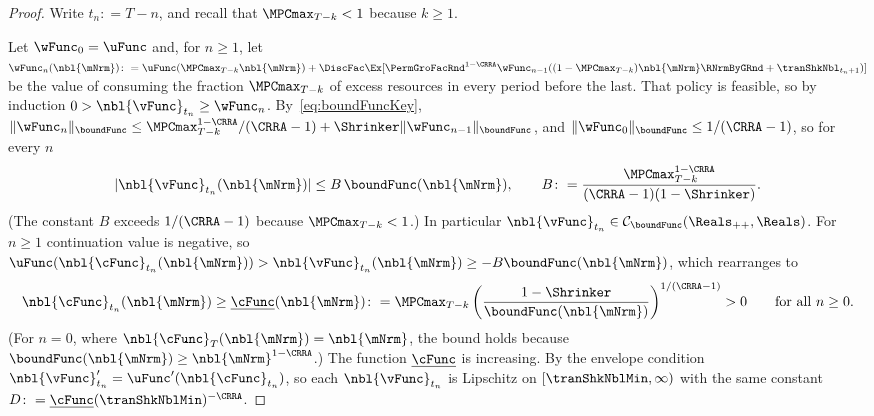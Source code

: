 \documentclass[\econtexRoot/BufferStockTheory]{subfiles}
\begin{document}
\begin{proof}
Write $t_{n}\colon=T-n$, and recall that $\MPCmax_{T-k}<1$ because $k\geq 1$.

Let $\wFunc_{0}=\uFunc$ and, for $n\geq 1$, let $\wFunc_{n}(\nbl{\mNrm})\colon=\uFunc(\MPCmax_{T-k}\nbl{\mNrm})+\DiscFac\Ex[\PermGroFacRnd^{1-\CRRA}\wFunc_{n-1}((1-\MPCmax_{T-k})\nbl{\mNrm}\RNrmByGRnd+\tranShkNbl_{t_{n}+1})]$ be the value of consuming the fraction $\MPCmax_{T-k}$ of excess resources in every period before the last.
That policy is feasible, so by induction $0>\nbl{\vFunc}_{t_{n}}\geq\wFunc_{n}$.
By~\eqref{eq:boundFuncKey}, $\Vert\wFunc_{n}\Vert_{\boundFunc}\leq\MPCmax_{T-k}^{1-\CRRA}/(\CRRA-1)+\Shrinker\Vert\wFunc_{n-1}\Vert_{\boundFunc}$, and $\Vert\wFunc_{0}\Vert_{\boundFunc}\leq 1/(\CRRA-1)$, so for every $n$
\begin{equation}\label{eq:valueBoundUniform}
  \vert\nbl{\vFunc}_{t_{n}}(\nbl{\mNrm})\vert\leq B\,\boundFunc(\nbl{\mNrm}),\qquad B\colon=\frac{\MPCmax_{T-k}^{1-\CRRA}}{(\CRRA-1)(1-\Shrinker)}.
\end{equation}
(The constant $B$ exceeds $1/(\CRRA-1)$ because $\MPCmax_{T-k}<1$.)
In particular $\nbl{\vFunc}_{t_{n}}\in\mathcal{C}_{\boundFunc}(\Reals_{++},\Reals)$.
For $n\geq 1$ continuation value is negative, so $\uFunc(\nbl{\cFunc}_{t_{n}}(\nbl{\mNrm}))>\nbl{\vFunc}_{t_{n}}(\nbl{\mNrm})\geq-B\boundFunc(\nbl{\mNrm})$, which rearranges to
\begin{equation}\label{eq:cLowerUniform}
  \nbl{\cFunc}_{t_{n}}(\nbl{\mNrm})\geq\underline{\cFunc}(\nbl{\mNrm})\colon=\MPCmax_{T-k}\left(\frac{1-\Shrinker}{\boundFunc(\nbl{\mNrm})}\right)^{1/(\CRRA-1)}>0\qquad\text{for all $n\geq 0$.}
\end{equation}
(For $n=0$, where $\nbl{\cFunc}_{T}(\nbl{\mNrm})=\nbl{\mNrm}$, the bound holds because $\boundFunc(\nbl{\mNrm})\geq\nbl{\mNrm}^{1-\CRRA}$.)
The function $\underline{\cFunc}$ is increasing.
By the envelope condition $\nbl{\vFunc}_{t_{n}}^{\prime}=\uFunc^{\prime}(\nbl{\cFunc}_{t_{n}})$, so each $\nbl{\vFunc}_{t_{n}}$ is Lipschitz on $[\tranShkNblMin,\infty)$ with the same constant $D\colon=\underline{\cFunc}(\tranShkNblMin)^{-\CRRA}$.


\end{proof}
\end{document}
